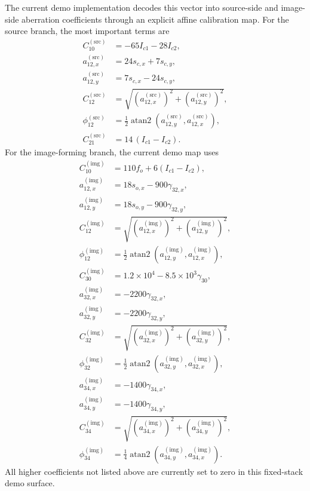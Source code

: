 \documentclass[11pt]{article}
\begin{document}
The current demo implementation decodes this vector into source-side and image-side
aberration coefficients through an explicit affine calibration map.  For the source
branch, the most important terms are
\begin{align}
  C_{10}^{(\mathrm{src})} &= -65 I_{c1} - 28 I_{c2}, \\
  a_{12,x}^{(\mathrm{src})} &= 24 s_{c,x} + 7 s_{c,y}, \\
  a_{12,y}^{(\mathrm{src})} &= 7 s_{c,x} - 24 s_{c,y}, \\
  C_{12}^{(\mathrm{src})} &=
  \sqrt{ \left(a_{12,x}^{(\mathrm{src})}\right)^2
       + \left(a_{12,y}^{(\mathrm{src})}\right)^2 }, \\
  \phi_{12}^{(\mathrm{src})} &=
  \tfrac{1}{2}\operatorname{atan2}
  \left(a_{12,y}^{(\mathrm{src})}, a_{12,x}^{(\mathrm{src})}\right), \\
  C_{21}^{(\mathrm{src})} &= 14\,(I_{c1}-I_{c2}).
\end{align}
For the image-forming branch, the current demo map uses
\begin{align}
  C_{10}^{(\mathrm{img})} &= 110 f_o + 6 (I_{c1}-I_{c2}), \\
  a_{12,x}^{(\mathrm{img})} &= 18 s_{o,x} - 900 \gamma_{32,x}, \\
  a_{12,y}^{(\mathrm{img})} &= 18 s_{o,y} - 900 \gamma_{32,y}, \\
  C_{12}^{(\mathrm{img})} &=
  \sqrt{ \left(a_{12,x}^{(\mathrm{img})}\right)^2
       + \left(a_{12,y}^{(\mathrm{img})}\right)^2 }, \\
  \phi_{12}^{(\mathrm{img})} &=
  \tfrac{1}{2}\operatorname{atan2}
  \left(a_{12,y}^{(\mathrm{img})}, a_{12,x}^{(\mathrm{img})}\right), \\
  C_{30}^{(\mathrm{img})} &= 1.2\times 10^4 - 8.5\times 10^3 \gamma_{30}, \\
  a_{32,x}^{(\mathrm{img})} &= -2200 \gamma_{32,x}, \\
  a_{32,y}^{(\mathrm{img})} &= -2200 \gamma_{32,y}, \\
  C_{32}^{(\mathrm{img})} &=
  \sqrt{ \left(a_{32,x}^{(\mathrm{img})}\right)^2
       + \left(a_{32,y}^{(\mathrm{img})}\right)^2 }, \\
  \phi_{32}^{(\mathrm{img})} &=
  \tfrac{1}{2}\operatorname{atan2}
  \left(a_{32,y}^{(\mathrm{img})}, a_{32,x}^{(\mathrm{img})}\right), \\
  a_{34,x}^{(\mathrm{img})} &= -1400 \gamma_{34,x}, \\
  a_{34,y}^{(\mathrm{img})} &= -1400 \gamma_{34,y}, \\
  C_{34}^{(\mathrm{img})} &=
  \sqrt{ \left(a_{34,x}^{(\mathrm{img})}\right)^2
       + \left(a_{34,y}^{(\mathrm{img})}\right)^2 }, \\
  \phi_{34}^{(\mathrm{img})} &=
  \tfrac{1}{4}\operatorname{atan2}
  \left(a_{34,y}^{(\mathrm{img})}, a_{34,x}^{(\mathrm{img})}\right).
\end{align}
All higher coefficients not listed above are currently set to zero in this fixed-stack
demo surface.
\end{document}
